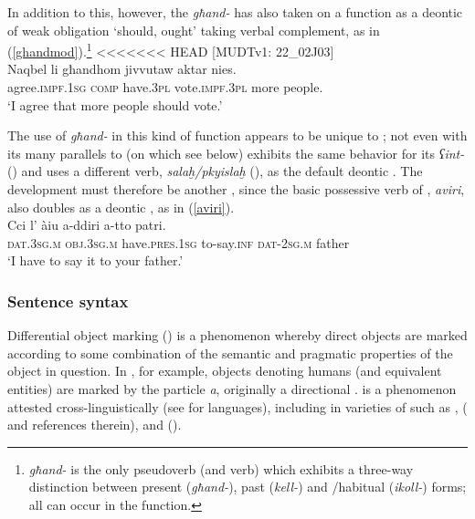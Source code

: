 \documentclass[output=paper]{langsci/langscibook}
\begin{document}
In addition to this, however, the  \textit{għand-} has also taken on a function as a deontic  of weak obligation `should, ought' taking verbal complement, as in (\ref{ghandmod}).\footnote{\textit{għand-} is the only  pseudoverb (and verb) which exhibits a three-way distinction between present (\textit{għand-}), past (\textit{kell-}) and /habitual (\textit{ikoll-}) forms; all can occur in the  function.}
<<<<<<< HEAD
\ea\label{ghandmod}
{[MUDTv1: 22\_02J03]} \\
    \gll Naqbel	li għandhom jivvutaw aktar nies.\\
	agree.\textsc{impf.1sg} \textsc{comp} have.\textsc{3pl} vote.\textsc{impf.3pl} more people.\\
	\glt `I agree that more people should vote.'\\
\z

The use of \textit{għand-} in this kind of  function appears to be unique to ; not even   with its many parallels to  (on which see below) exhibits the same behavior for its  \textit{ʕint-} (\citealt[346]{Borg2004}) and uses a different verb, \textit{salaḫ/pkyislaḫ} (\citealt[323]{Borg2004}), as the default deontic . The  development must therefore be another , since the basic possessive verb of , \textit{aviri}, also doubles as a deontic , as in (\ref{aviri}).
\ea\label{aviri}
    \\
    \gll Cci l' àiu a-ddiri a-tto patri.\\
	\textsc{dat.3sg.m} \textsc{obj.3sg.m} have.\textsc{pres.1sg} to-say.\textsc{inf} \textsc{dat-2sg.m} father\\
	\glt `I have to say it to your father.'\\
\z

\subsubsection{Sentence syntax}
Differential object marking () is a phenomenon whereby direct objects are marked according to some combination of the semantic and pragmatic properties of the object in question. In , for example, objects denoting humans (and equivalent entities) are marked by the particle \textit{a}, originally a directional .  is a phenomenon attested cross-linguistically (see \citealt{Khan1984} for  languages), including in varieties of  such as ,  (\citealt{Coghill2014} and references therein), and  (\citealt[108]{Andalusi2013}).
\end{document}
